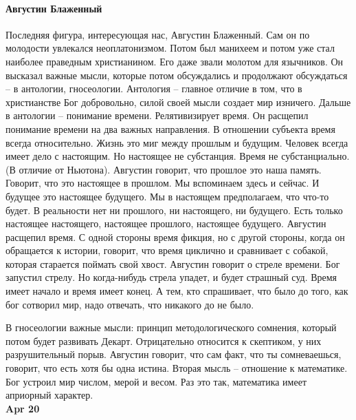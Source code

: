 \documentclass[a4paper, 12pt]{article}
\begin{document}
\paragraph{Августин Блаженный}Последняя фигура, интересующая нас, Августин Блаженный. Сам он по молодости увлекался неоплатонизмом. Потом был манихеем и потом уже стал наиболее праведным христианином. Его даже звали молотом для язычников. Он высказал важные мысли, которые потом обсуждались и продолжают обсуждаться -- в антологии, гносеологии. Антология -- главное отличие в том, что в христианстве Бог добровольно, силой своей мысли создает мир изничего. Дальше в антологии -- понимание времени. Релятивизирует время. Он расщепил понимание времени на два важных направления. В отношении субъекта время всегда относительно. Жизнь это миг между прошлым и будущим. Человек всегда имеет дело с настоящим. Но настоящее не субстанция. Время не субстанциально. (В отличие от Ньютона). Августин говорит, что прошлое это наша память. Говорит, что это настоящее в прошлом. Мы вспоминаем здесь и сейчас. И будущее это настоящее будущего. Мы в настоящем предполагаем, что что-то будет. В реальности нет ни прошлого, ни настоящего, ни будущего. Есть только настоящее настоящего, настоящее прошлого, настоящее будущего. Августин расщепил время. С одной стороны время фикция, но с другой стороны, когда он обращается к истории, говорит, что время циклично и сравнивает с собакой, которая старается поймать свой хвост. Августин говорит о стреле времени. Бог запустил стрелу. Но когда-нибудь стрела упадет, и будет страшный суд. Время имеет начало и время имеет конец. А тем, кто спрашивает, что было до того, как бог сотворил мир, надо отвечать, что никакого до не было. 

В гносеологии важные мысли: принцип методологического сомнения, который потом будет развивать Декарт. Отрицательно относится к скептиком, у них разрушительный порыв. Августин говорит, что сам факт, что ты сомневаешься, говорит, что есть хотя бы одна истина. Вторая мысль -- отношение к математике. Бог устроил мир числом, мерой и весом. Раз это так, математика имеет априорный характер. 
\\

\hfill \textbf{Apr 20}
\end{document}

